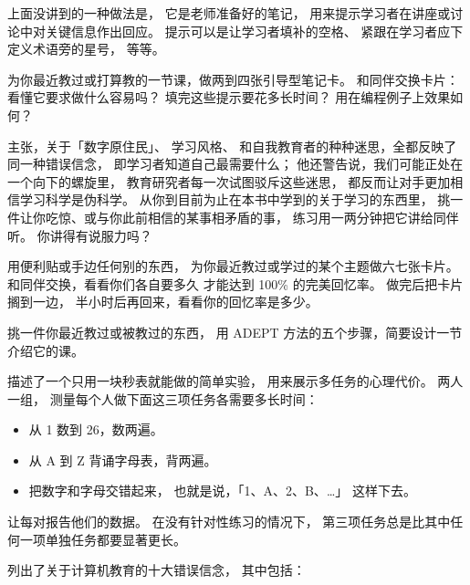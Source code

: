 
上面没讲到的一种做法是，
它是老师准备好的笔记，
用来提示学习者在讲座或讨论中对关键信息作出回应。
提示可以是让学习者填补的空格、
紧跟在学习者应下定义术语旁的星号，
等等。

为你最近教过或打算教的一节课，做两到四张引导型笔记卡。
和同伴交换卡片：
看懂它要求做什么容易吗？
填完这些提示要花多长时间？
用在编程例子上效果如何？


\cite{Kirs2013}主张，关于「数字原住民」、
学习风格、
和自我教育者的种种迷思，全都反映了同一种错误信念，
即学习者知道自己最需要什么；
他还警告说，我们可能正处在一个向下的螺旋里，
教育研究者每一次试图驳斥这些迷思，
都反而让对手更加相信学习科学是伪科学。
从你到目前为止在本书中学到的关于学习的东西里，
挑一件让你吃惊、或与你此前相信的某事相矛盾的事，
练习用一两分钟把它讲给同伴听。
你讲得有说服力吗？


用便利贴或手边任何别的东西，
为你最近教过或学过的某个主题做六七张卡片。
和同伴交换，看看你们各自要多久
才能达到 100\% 的完美回忆率。
做完后把卡片搁到一边，
半小时后再回来，看看你的回忆率是多少。


挑一件你最近教过或被教过的东西，
用 ADEPT 方法的五个步骤，简要设计一节介绍它的课。


描述了一个只用一块秒表就能做的简单实验，
用来展示多任务的心理代价。
两人一组，
测量每个人做下面这三项任务各需要多长时间：

\begin{itemize}
\item
  从 1 数到 26，数两遍。
\item
  从 A 到 Z 背诵字母表，背两遍。
\item
  把数字和字母交错起来，
  也就是说，「1、A、2、B、{\ldots}」
  这样下去。
\end{itemize}

让每对报告他们的数据。
在没有针对性练习的情况下，
第三项任务总是比其中任何一项单独任务都要显著更长。


\cite{Guzd2015b}列出了关于计算机教育的十大错误信念，
其中包括：

